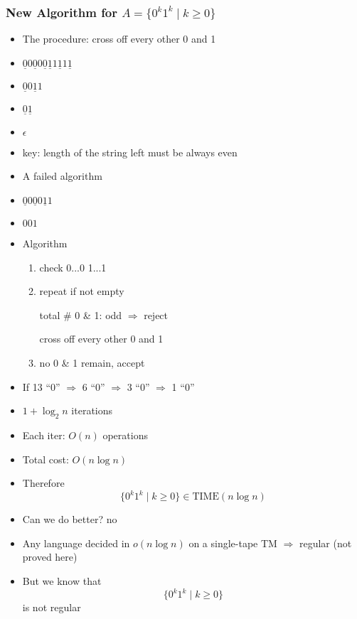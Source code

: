 \begin{frame}[allowframebreaks]
\begin{itemize}
\end{itemize}\end{frame} \begin{frame}[allowframebreaks] \frametitle{New Algorithm for $A=\{0^k 1^k\mid k \geq 0\}$}
  \begin{itemize}
\item The procedure: cross off every other 0 and 1
\item []$\underline{0}0
\underline{0}0
\underline{0}
\underline{1}1
\underline{1}1
\underline{1}
$
\item []
$\underline{0}0
\underline{1}1
$
\item []
$\underline{0}
\underline{1}
$
\item []
$\epsilon$

\item [] key: length of the string left must be always even

\item A failed algorithm

\item []
$\underline{0}0
\underline{0}0
\underline{1}1
$
\item []
$001
$

\item 
Algorithm
\begin{enumerate}
\item check 0...0 1...1
\item repeat if not empty 

total \# 0 \& 1: odd $\Rightarrow$ reject

cross off every other 0 and 1
\item no 0 \& 1 remain, accept
\end{enumerate}
\item If  13 ``0'' $\Rightarrow$
6 ``0'' $\Rightarrow$
3 ``0'' $\Rightarrow$
1 ``0'' 

\item [] $1+\log_2 n$ iterations

\item Each iter: $O(n)$ operations

\item Total cost: $O(n \log n)$

\item Therefore
  \begin{equation*}
\{0^k 1^k\mid k \geq 0\} \in \text{TIME}(n \log n)
\end{equation*}
\item Can we do better? no

\item Any language decided in $o(n\log n)$
on a single-tape TM $\Rightarrow$ regular
(not proved here)
\item But we know that
  \begin{equation*}
  \{0^k1^k \mid k \geq 0\}
\end{equation*}
is not regular


\end{itemize}
\end{frame}
